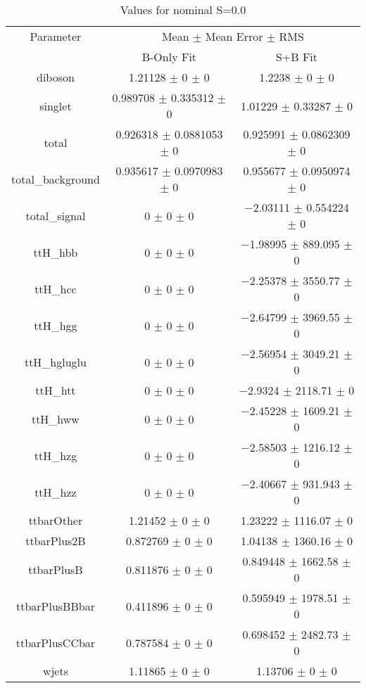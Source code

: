 \begin{table}
\centering
\caption{Values for nominal S=0.0}
\begin{tabular}{ccc}
\toprule
Parameter & \multicolumn{2}{c}{Mean $\pm$ Mean Error $\pm$ RMS}\\
 & B-Only Fit & S+B Fit\\
\midrule
diboson & \num{1.21128} $\pm$ \num{0} $\pm$ \num{0} & \num{1.2238} $\pm$ \num{0} $\pm$ \num{0}\\
singlet & \num{0.989708} $\pm$ \num{0.335312} $\pm$ \num{0} & \num{1.01229} $\pm$ \num{0.33287} $\pm$ \num{0}\\
total & \num{0.926318} $\pm$ \num{0.0881053} $\pm$ \num{0} & \num{0.925991} $\pm$ \num{0.0862309} $\pm$ \num{0}\\
total\_background & \num{0.935617} $\pm$ \num{0.0970983} $\pm$ \num{0} & \num{0.955677} $\pm$ \num{0.0950974} $\pm$ \num{0}\\
total\_signal & \num{0} $\pm$ \num{0} $\pm$ \num{0} & \num{-2.03111} $\pm$ \num{0.554224} $\pm$ \num{0}\\
ttH\_hbb & \num{0} $\pm$ \num{0} $\pm$ \num{0} & \num{-1.98995} $\pm$ \num{889.095} $\pm$ \num{0}\\
ttH\_hcc & \num{0} $\pm$ \num{0} $\pm$ \num{0} & \num{-2.25378} $\pm$ \num{3550.77} $\pm$ \num{0}\\
ttH\_hgg & \num{0} $\pm$ \num{0} $\pm$ \num{0} & \num{-2.64799} $\pm$ \num{3969.55} $\pm$ \num{0}\\
ttH\_hgluglu & \num{0} $\pm$ \num{0} $\pm$ \num{0} & \num{-2.56954} $\pm$ \num{3049.21} $\pm$ \num{0}\\
ttH\_htt & \num{0} $\pm$ \num{0} $\pm$ \num{0} & \num{-2.9324} $\pm$ \num{2118.71} $\pm$ \num{0}\\
ttH\_hww & \num{0} $\pm$ \num{0} $\pm$ \num{0} & \num{-2.45228} $\pm$ \num{1609.21} $\pm$ \num{0}\\
ttH\_hzg & \num{0} $\pm$ \num{0} $\pm$ \num{0} & \num{-2.58503} $\pm$ \num{1216.12} $\pm$ \num{0}\\
ttH\_hzz & \num{0} $\pm$ \num{0} $\pm$ \num{0} & \num{-2.40667} $\pm$ \num{931.943} $\pm$ \num{0}\\
ttbarOther & \num{1.21452} $\pm$ \num{0} $\pm$ \num{0} & \num{1.23222} $\pm$ \num{1116.07} $\pm$ \num{0}\\
ttbarPlus2B & \num{0.872769} $\pm$ \num{0} $\pm$ \num{0} & \num{1.04138} $\pm$ \num{1360.16} $\pm$ \num{0}\\
ttbarPlusB & \num{0.811876} $\pm$ \num{0} $\pm$ \num{0} & \num{0.849448} $\pm$ \num{1662.58} $\pm$ \num{0}\\
ttbarPlusBBbar & \num{0.411896} $\pm$ \num{0} $\pm$ \num{0} & \num{0.595949} $\pm$ \num{1978.51} $\pm$ \num{0}\\
ttbarPlusCCbar & \num{0.787584} $\pm$ \num{0} $\pm$ \num{0} & \num{0.698452} $\pm$ \num{2482.73} $\pm$ \num{0}\\
wjets & \num{1.11865} $\pm$ \num{0} $\pm$ \num{0} & \num{1.13706} $\pm$ \num{0} $\pm$ \num{0}\\
\bottomrule
\end{tabular}
\end{table}